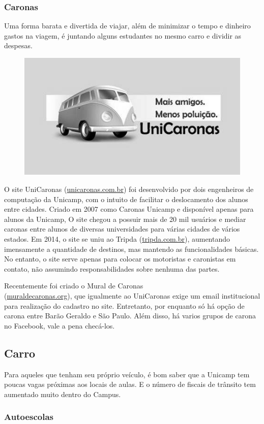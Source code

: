 \subsubsection*{Caronas}

Uma forma barata e divertida de viajar, além de minimizar o tempo e dinheiro
gastos na viagem, é juntando alguns estudantes no mesmo carro e dividir as
despesas.
\begin{figure}[h!]  \centering
    \includegraphics[width=.45\textwidth]{img/barao/unicaronas.jpg}
\end{figure}

O site UniCaronas (\url{unicaronas.com.br}) foi desenvolvido por dois
engenheiros de computação da Unicamp, com o intuito de facilitar o deslocamento
dos alunos entre cidades. Criado em 2007 como Caronas Unicamp e disponível
apenas para alunos da Unicamp, O site chegou a possuir mais de 20 mil usuários e
mediar caronas entre alunos de diversas universidades para várias cidades de
vários estados. Em 2014, o site se uniu ao Tripda (\url{tripda.com.br}),
aumentando imensamente a quantidade de destinos, mas mantendo as funcionalidades
básicas. No entanto, o site serve apenas para colocar os motoristas e caronistas
em contato, não assumindo responsabilidades sobre nenhuma das partes.

Recentemente foi criado o Mural de Caronas\\(\url{muraldecaronas.org}), que
igualmente ao UniCaronas exige um email institucional para realização do
cadastro no site. Entretanto, por enquanto só há opção de carona entre Barão
Geraldo e São Paulo. Além disso, há varios grupos de carona no Facebook, vale a
pena checá-los.

\subsection{Carro}

Para aqueles que tenham seu próprio veículo, é bom saber que a Unicamp tem
poucas vagas próximas aos locais de aulas. E o número de fiscais de trânsito tem
aumentado muito dentro do Campus.

\subsubsection*{Autoescolas}

